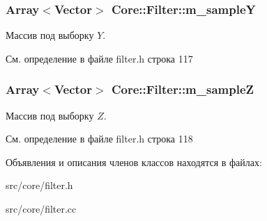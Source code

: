 \subsubsection[{\texorpdfstring{m\+\_\+sampleY}{m_sampleY}}]{\setlength{\rightskip}{0pt plus 5cm}Array$<$Vector$>$ Core\+::\+Filter\+::m\+\_\+sampleY\hspace{0.3cm}{\ttfamily [protected]}}\hypertarget{class_core_1_1_filter_a3e2e475b650504bb7c800e3f27364580}{}\label{class_core_1_1_filter_a3e2e475b650504bb7c800e3f27364580}
Массив под выборку $Y$. 

См. определение в файле filter.\+h строка 117

\subsubsection[{\texorpdfstring{m\+\_\+sampleZ}{m_sampleZ}}]{\setlength{\rightskip}{0pt plus 5cm}Array$<$Vector$>$ Core\+::\+Filter\+::m\+\_\+sampleZ\hspace{0.3cm}{\ttfamily [protected]}}\hypertarget{class_core_1_1_filter_af0e905e89bc5db8e07f283b68fb57a60}{}\label{class_core_1_1_filter_af0e905e89bc5db8e07f283b68fb57a60}
Массив под выборку $Z$. 

См. определение в файле filter.\+h строка 118



Объявления и описания членов классов находятся в файлах\+:\begin{DoxyCompactItemize}
\item 
src/core/filter.\+h\item 
src/core/filter.\+cc\end{DoxyCompactItemize}
